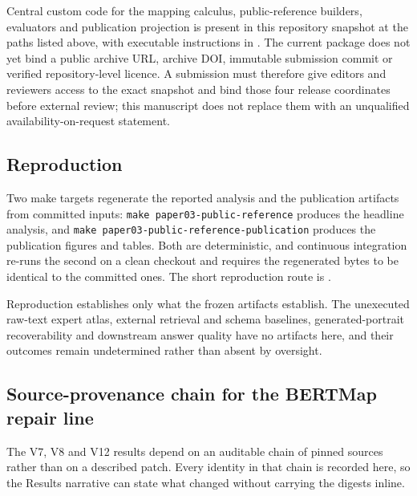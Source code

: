 Central custom code for the mapping calculus, public-reference builders,
evaluators and publication projection is present in this repository snapshot
at the paths listed above, with executable instructions in .
The current package does not yet bind a public archive URL, archive DOI,
immutable submission commit or verified repository-level licence. A submission
must therefore give editors and reviewers access to the exact snapshot and bind
those four release coordinates before external review; this manuscript does
not replace them with an unqualified availability-on-request statement.

\subsection{Reproduction}

Two make targets regenerate the reported analysis and the publication
artifacts from committed inputs: \texttt{make paper03-public-reference}
produces the headline analysis, and \texttt{make
paper03-public-reference-publication} produces the publication figures and
tables. Both are deterministic, and continuous integration re-runs the second
on a clean checkout and requires the regenerated bytes to be identical to the
committed ones. The short reproduction route is .

Reproduction establishes only what the frozen artifacts establish. The
unexecuted raw-text expert atlas, external retrieval and schema baselines,
generated-portrait recoverability and downstream answer quality have no
artifacts here, and their outcomes remain undetermined rather than absent by
oversight.


\subsection{Source-provenance chain for the BERTMap repair line}

The V7, V8 and V12 results depend on an auditable chain of pinned sources rather
than on a described patch. Every identity in that chain is recorded here, so the
Results narrative can state what changed without carrying the digests inline.

